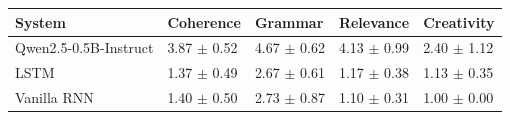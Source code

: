 \begin{tabular}{lllll}
\toprule
System & Coherence & Grammar & Relevance & Creativity \\
\midrule
Qwen2.5-0.5B-Instruct & 3.87 $\pm$ 0.52 & 4.67 $\pm$ 0.62 & 4.13 $\pm$ 0.99 & 2.40 $\pm$ 1.12 \\
LSTM & 1.37 $\pm$ 0.49 & 2.67 $\pm$ 0.61 & 1.17 $\pm$ 0.38 & 1.13 $\pm$ 0.35 \\
Vanilla RNN & 1.40 $\pm$ 0.50 & 2.73 $\pm$ 0.87 & 1.10 $\pm$ 0.31 & 1.00 $\pm$ 0.00 \\
\bottomrule
\end{tabular}
